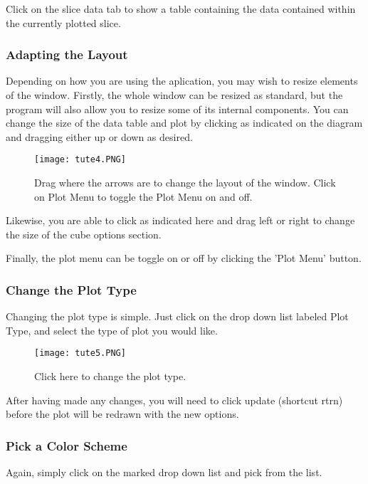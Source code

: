 \documentclass[a4paper,12pt]{article}
\begin{document}
Click on the slice data tab to show a table containing the data contained
within the currently plotted slice.

\subsubsection{Adapting the Layout}

Depending on how you are using the aplication, you may wish to resize elements
of the window. Firstly, the whole window can be resized as standard, but the
program will also allow you to resize some of its internal components. You can
change the size of the data table and plot by clicking as indicated on the
diagram and dragging either up or down as desired.

\begin{figure}[H]
\centering
\texttt{[image: tute4.PNG]}
\caption{Drag where the arrows are to change the layout of the window. Click on
Plot Menu to toggle the Plot Menu on and off.}
\label{overflow}
\end{figure}

Likewise, you are able to click as indicated here and drag left or right to
change the size of the cube options section.

Finally, the plot menu can be toggle on or off by clicking the 'Plot Menu'
button.

\subsubsection{Change the Plot Type}

Changing the plot type is simple. Just click on the drop down list labeled
Plot Type, and select the type of plot you would like.

\begin{figure}[H]
\centering
\texttt{[image: tute5.PNG]}
\caption{Click here to change the plot type.}
\label{overflow}
\end{figure}

After having made any changes, you will need to click update (shortcut rtrn)
before the plot will be redrawn with the new options.

\subsubsection{Pick a Color Scheme}

Again, simply click on the marked drop down list and pick from the list.
\end{document}
